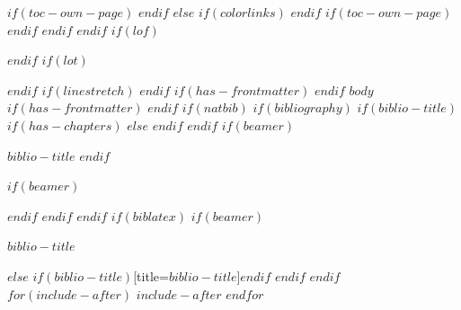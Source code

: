 \documentclass[
$if(fontsize)$
  $fontsize$,
$endif$
$if(lang)$
  $babel-lang$,
$endif$
$if(papersize)$
  $papersize$paper,
$else$
  paper=a4,
$endif$
$if(beamer)$
  ignorenonframetext,
$if(handout)$
  handout,
$endif$
$if(aspectratio)$
  aspectratio=$aspectratio$,
$endif$
$endif$
$for(classoption)$
  $classoption$$sep$,
$endfor$
  ,captions=tableheading
]{$if(beamer)$$documentclass$$else$$if(book)$scrbook$else$scrartcl$endif$$endif$}
\newif\ifbibliography
\begin{document}
$if(toc-own-page)$
\newpage
$endif$
$else$
{
$if(colorlinks)$
\hypersetup{linkcolor=$if(toccolor)$$toccolor$$else$$endif$}
$endif$
\setcounter{tocdepth}{$toc-depth$}
\tableofcontents
$if(toc-own-page)$
\newpage
$endif$
}
$endif$
$endif$
$if(lof)$
\listoffigures
$endif$
$if(lot)$
\listoftables
$endif$
$if(linestretch)$
$endif$
$if(has-frontmatter)$
\mainmatter
$endif$
$body$
$if(has-frontmatter)$
\backmatter
$endif$
$if(natbib)$
$if(bibliography)$
$if(biblio-title)$
$if(has-chapters)$
\renewcommand\bibname{$biblio-title$}
$else$
\renewcommand\refname{$biblio-title$}
$endif$
$endif$
$if(beamer)$
\begin{frame}[allowframebreaks]{$biblio-title$}
  \bibliographytrue
$endif$
  
$if(beamer)$
\end{frame}
$endif$
$endif$
$endif$
$if(biblatex)$
$if(beamer)$
\begin{frame}[allowframebreaks]{$biblio-title$}
  \bibliographytrue
  \printbibliography[heading=none]
\end{frame}
$else$
\printbibliography$if(biblio-title)$[title=$biblio-title$]$endif$
$endif$
$endif$
$for(include-after)$
$include-after$
$endfor$
\end{document}
